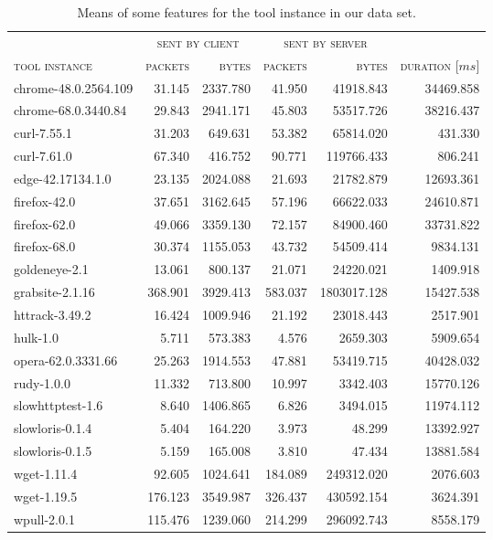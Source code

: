 \begin{table}[H]
	\centering
	\begin{tabular}{lrrrrr}
		\toprule
		 & \multicolumn{2}{c}{\textsc{sent by client}} & \multicolumn{2}{c}{\textsc{sent by server}}\\
		\cmidrule(lr){2-3}
		\cmidrule(lr){4-5}
		\textsc{tool instance} & \textsc{packets} & \textsc{bytes} & \textsc{packets} & \textsc{bytes} & \textsc{duration} [$ms$]\\
		\midrule
		chrome-48.0.2564.109 & 31.145 & 2337.780 & 41.950 & 41918.843 & 34469.858\\
		chrome-68.0.3440.84 & 29.843 & 2941.171 & 45.803 & 53517.726 & 38216.437\\
		curl-7.55.1 & 31.203 & 649.631 & 53.382 & 65814.020 & 431.330\\
		curl-7.61.0 & 67.340 & 416.752 & 90.771 & 119766.433 & 806.241\\
		edge-42.17134.1.0 & 23.135 & 2024.088 & 21.693 & 21782.879 & 12693.361\\
		firefox-42.0 & 37.651 & 3162.645 & 57.196 & 66622.033 & 24610.871\\
		firefox-62.0 & 49.066 & 3359.130 & 72.157 & 84900.460 & 33731.822\\
		firefox-68.0 & 30.374 & 1155.053 & 43.732 & 54509.414 & 9834.131\\
		goldeneye-2.1 & 13.061 & 800.137 & 21.071 & 24220.021 & 1409.918\\
		grabsite-2.1.16 & 368.901 & 3929.413 & 583.037 & 1803017.128 & 15427.538\\
		httrack-3.49.2 & 16.424 & 1009.946 & 21.192 & 23018.443 & 2517.901\\
		hulk-1.0 & 5.711 & 573.383 & 4.576 & 2659.303 & 5909.654\\
		opera-62.0.3331.66 & 25.263 & 1914.553 & 47.881 & 53419.715 & 40428.032\\
		rudy-1.0.0 & 11.332 & 713.800 & 10.997 & 3342.403 & 15770.126\\
		slowhttptest-1.6 & 8.640 & 1406.865 & 6.826 & 3494.015 & 11974.112\\
		slowloris-0.1.4 & 5.404 & 164.220 & 3.973 & 48.299 & 13392.927\\
		slowloris-0.1.5 & 5.159 & 165.008 & 3.810 & 47.434 & 13881.584\\
		wget-1.11.4 & 92.605 & 1024.641 & 184.089 & 249312.020 & 2076.603\\
		wget-1.19.5 & 176.123 & 3549.987 & 326.437 & 430592.154 & 3624.391\\
		wpull-2.0.1 & 115.476 & 1239.060 & 214.299 & 296092.743 & 8558.179\\
		\bottomrule
	\end{tabular}
	\caption{Means of some features for the tool instance in our data set.}
	\label{tab:means_application_long}
\end{table}
